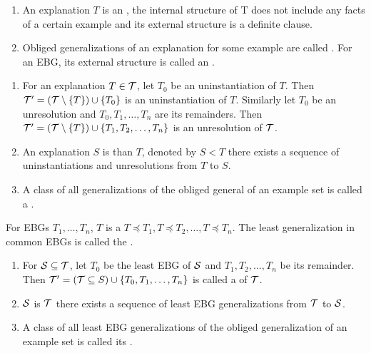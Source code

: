 \begin{defi}
\begin{enumerate}
 \item An explanation $T$ is an , \iffTx{} the internal structure of T does not include any facts of a certain example and its external structure is a definite clause.
 \item Obliged generalizations of an explanation for some example are called . For an EBG, its external structure is called an .
\end{enumerate}
\cite{conf/ijcai/YamamuraK91}
\end{defi}

\begin{defi}
\begin{enumerate}
 \item For an explanation $T\in\mathcal{T}$, let $T_0$ be an uninstantiation of $T$. Then $\mathcal{T}'=\left( \mathcal{T}\setminus\left\{ T\right\}\right)\cup\left\{ T_0\right\}$ is an uninstantiation of $T$. Similarly let $T_0$ be an unresolution and $T_0,T_1,\ldots,T_n$ are its remainders. Then $\mathcal{T}'=\left( \mathcal{T}\setminus\left\{ T\right\}\right)\cup\left\{ T_1,T_2,\ldots,T_n\right\}$ is an unresolution of $\mathcal{T}$.
 \item An explanation $S$ is  than $T$, denoted by $S<T$ \iffTx{} there exists a sequence of uninstantiations and unresolutions from $T$ to $S$.
 \item A class of all generalizations of the obliged general of an example set is called a .
\end{enumerate}
\cite{conf/ijcai/YamamuraK91}
\end{defi}

\begin{defi}
For EBGs $T_1,\ldots,T_n$, $T$ is a  \iffTx{} $T\preceq T_1,T\preceq T_2,\ldots,T\preceq T_n$. The least generalization in common EBGs is called the .
\cite{conf/ijcai/YamamuraK91}
\end{defi}

\begin{defi}
\begin{enumerate}
 \item For $\mathcal{S}\subseteq\mathcal{T}$, let $T_0$ be the least EBG of $\mathcal{S}$ and $T_1,T_2,\ldots,T_n$ be its remainder. Then $\mathcal{T}'=\left( \mathcal{T}\subseteq S\right)\cup\left\{ T_0,T_1,\ldots,T_n\right\}$ is called a  of $\mathcal{T}$.
 \item $\mathcal{S}$ is  $\mathcal{T}$ \iffTx{} there exists a sequence of least EBG generalizations from $\mathcal{T}$ to $\mathcal{S}$.
 \item A class of all least EBG generalizations of the obliged generalization of an example set is called its .
\end{enumerate}
\cite{conf/ijcai/YamamuraK91}
\end{defi}

